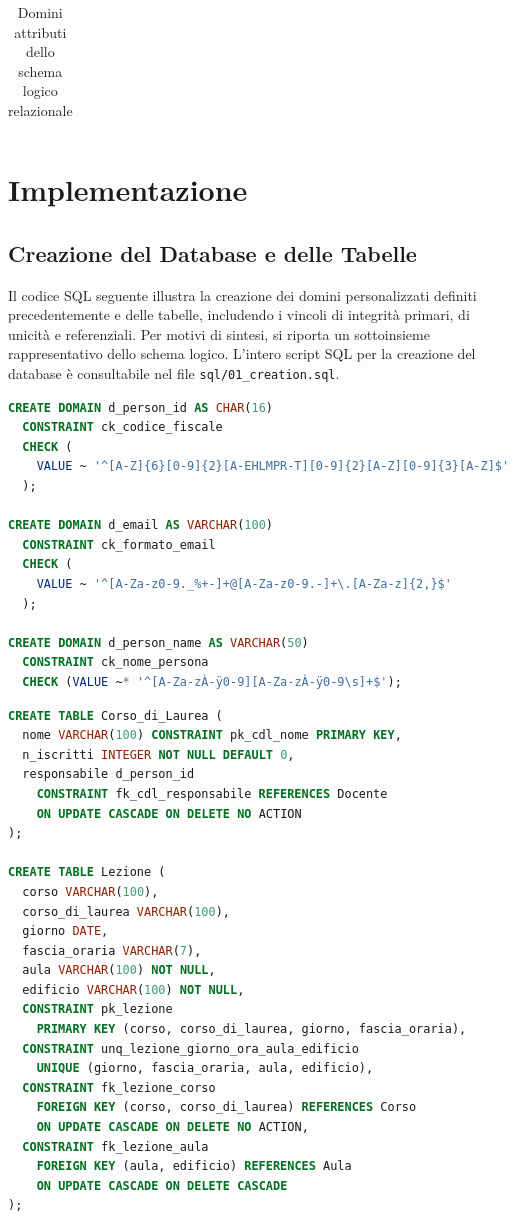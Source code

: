 \documentclass[a4paper,11pt]{article}
\begin{document}
\begin{table}[H]
\begin{tabularx}{\textwidth}{l l X}
    \bottomrule
\end{tabularx}
\caption{Domini attributi dello schema logico relazionale}
\label{tab:attributes_rel_schema}
\end{table}

\newpage
\section{Implementazione}
\subsection{Creazione del Database e delle Tabelle}

Il codice SQL seguente illustra la creazione dei domini personalizzati definiti precedentemente e delle tabelle, includendo i vincoli di integrità primari, di unicità e referenziali. Per motivi di sintesi, si riporta un sottoinsieme rappresentativo dello schema logico. L'intero script SQL per la creazione del database è consultabile nel file \texttt{sql/01\_creation.sql}.
\begin{lstlisting}[language=SQL, title={Creazione di domini}]
CREATE DOMAIN d_person_id AS CHAR(16) 
  CONSTRAINT ck_codice_fiscale 
  CHECK (
    VALUE ~ '^[A-Z]{6}[0-9]{2}[A-EHLMPR-T][0-9]{2}[A-Z][0-9]{3}[A-Z]$'
  );

CREATE DOMAIN d_email AS VARCHAR(100) 
  CONSTRAINT ck_formato_email 
  CHECK (
    VALUE ~ '^[A-Za-z0-9._%+-]+@[A-Za-z0-9.-]+\.[A-Za-z]{2,}$'
  );

CREATE DOMAIN d_person_name AS VARCHAR(50) 
  CONSTRAINT ck_nome_persona 
  CHECK (VALUE ~* '^[A-Za-zÀ-ÿ0-9][A-Za-zÀ-ÿ0-9\s]+$');
\end{lstlisting}

\begin{lstlisting}[language=SQL, title={Creazione di tabelle}]
CREATE TABLE Corso_di_Laurea (
  nome VARCHAR(100) CONSTRAINT pk_cdl_nome PRIMARY KEY,
  n_iscritti INTEGER NOT NULL DEFAULT 0,
  responsabile d_person_id 
    CONSTRAINT fk_cdl_responsabile REFERENCES Docente 
    ON UPDATE CASCADE ON DELETE NO ACTION
);

CREATE TABLE Lezione (
  corso VARCHAR(100),
  corso_di_laurea VARCHAR(100),
  giorno DATE,
  fascia_oraria VARCHAR(7),
  aula VARCHAR(100) NOT NULL,
  edificio VARCHAR(100) NOT NULL,
  CONSTRAINT pk_lezione 
    PRIMARY KEY (corso, corso_di_laurea, giorno, fascia_oraria),
  CONSTRAINT unq_lezione_giorno_ora_aula_edificio 
    UNIQUE (giorno, fascia_oraria, aula, edificio),
  CONSTRAINT fk_lezione_corso 
    FOREIGN KEY (corso, corso_di_laurea) REFERENCES Corso 
    ON UPDATE CASCADE ON DELETE NO ACTION,
  CONSTRAINT fk_lezione_aula 
    FOREIGN KEY (aula, edificio) REFERENCES Aula 
    ON UPDATE CASCADE ON DELETE CASCADE
);
\end{lstlisting}
\end{document}
